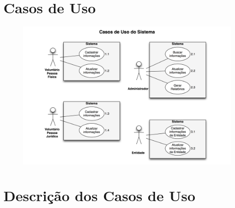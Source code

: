 \section{Casos de Uso}
\begin{figure}[h]
  \begin{center}
    \includegraphics[scale=.195]{casosDeUsoJCI.png}
   \end{center}    
\end{figure}

\newpage
\section{Descrição dos Casos de Uso}
